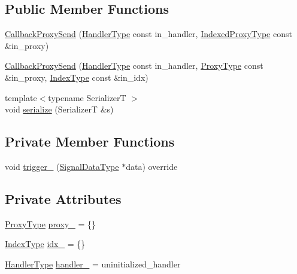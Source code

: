 \subsection*{Public Member Functions}
\begin{DoxyCompactItemize}
\item 
\hyperlink{structvt_1_1pipe_1_1callback_1_1_callback_proxy_send_ad7303f015585ba4e65bab3bbcdd50d94}{Callback\+Proxy\+Send} (\hyperlink{namespacevt_af64846b57dfcaf104da3ef6967917573}{Handler\+Type} const in\+\_\+handler, \hyperlink{structvt_1_1pipe_1_1callback_1_1_callback_proxy_send_a993aff1afaaf07a0d2c60a4ca96426f8}{Indexed\+Proxy\+Type} const \&in\+\_\+proxy)
\item 
\hyperlink{structvt_1_1pipe_1_1callback_1_1_callback_proxy_send_a8f06691ac7ab74789efa60b075de3c2e}{Callback\+Proxy\+Send} (\hyperlink{namespacevt_af64846b57dfcaf104da3ef6967917573}{Handler\+Type} const in\+\_\+handler, \hyperlink{structvt_1_1pipe_1_1callback_1_1_callback_proxy_send_a2aece7c6f8bd17a4c0b1fdca75d84579}{Proxy\+Type} const \&in\+\_\+proxy, \hyperlink{structvt_1_1pipe_1_1callback_1_1_callback_proxy_send_adf233dca6b029304153ba59fecf6113f}{Index\+Type} const \&in\+\_\+idx)
\item 
{\footnotesize template$<$typename SerializerT $>$ }\\void \hyperlink{structvt_1_1pipe_1_1callback_1_1_callback_proxy_send_a3f19aedbb799628c77163b440d3b6d03}{serialize} (SerializerT \&s)
\end{DoxyCompactItemize}
\subsection*{Private Member Functions}
\begin{DoxyCompactItemize}
\item 
void \hyperlink{structvt_1_1pipe_1_1callback_1_1_callback_proxy_send_ab961a5a59f7597cefb69603b1d31f6b1}{trigger\+\_\+} (\hyperlink{structvt_1_1pipe_1_1callback_1_1_callback_proxy_send_a2a8b17dedeb5cc2b68ca5c7386796ef3}{Signal\+Data\+Type} $\ast$data) override
\end{DoxyCompactItemize}
\subsection*{Private Attributes}
\begin{DoxyCompactItemize}
\item 
\hyperlink{structvt_1_1pipe_1_1callback_1_1_callback_proxy_send_a2aece7c6f8bd17a4c0b1fdca75d84579}{Proxy\+Type} \hyperlink{structvt_1_1pipe_1_1callback_1_1_callback_proxy_send_a324fc5697bd625cf1a3f8961855886d9}{proxy\+\_\+} = \{\}
\item 
\hyperlink{structvt_1_1pipe_1_1callback_1_1_callback_proxy_send_adf233dca6b029304153ba59fecf6113f}{Index\+Type} \hyperlink{structvt_1_1pipe_1_1callback_1_1_callback_proxy_send_a1a9b4802acd720bc1fa50a7ebcb0c49e}{idx\+\_\+} = \{\}
\item 
\hyperlink{namespacevt_af64846b57dfcaf104da3ef6967917573}{Handler\+Type} \hyperlink{structvt_1_1pipe_1_1callback_1_1_callback_proxy_send_a913ed1823ba404d9f6675e8ef08bdca1}{handler\+\_\+} = uninitialized\+\_\+handler
\end{DoxyCompactItemize}
